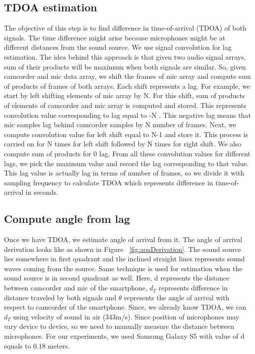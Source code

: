 \subsection{TDOA estimation}
The objective of this step is to find difference in time-of-arrival (TDOA) of both signals. The time difference might arise because microphones might be at different distances from the sound source. We use signal convolution for lag estimation. The idea behind this approach is that given two audio signal arrays, sum of their products will be maximum when both signals are similar. So, given camcorder and mic data array, we shift the frames of mic array and compute sum of products of frames of both arrays. Each shift represents a lag. For example, we start by left shifting elements of mic array by N. For this shift, sum of products of elements of camcorder and mic array is computed and  stored. This represents convolution value corresponding to lag equal to -N . This negative lag means that mic samples lag behind camcorder samples by N number of frames. Next, we compute convolution value for left shift equal to N-1 and store it. This process is carried on for N times for left shift followed by N times for right shift. We also compute sum of products for 0 lag.
From all these convolution values for different lags, we pick the maximum value and record the lag corresponding to that value. This lag value is actually lag in terms of number of frames, so we divide it with sampling frequency to calculate TDOA which represents difference in time-of-arrival in seconds.

\subsection{Compute angle from lag}
Once we have TDOA, we estimate angle of arrival from it. The angle of arrival derivation looks like as shown in Figure ~\ref{fig:aoaDerivation}. The sound source lies somewhere in first quadrant and the inclined straight lines represents sound waves coming from the source. Same technique is used for estimation when the sound source is in second quadrant as well. Here, d represents the distance between camcorder and mic of the smartphone, $d_T$ represents difference in distance traveled by both signals and $\theta$ represents the angle of arrival with respect to camcorder of the smartphone. Since, we already know TDOA, we can  $d_T$ using velocity of sound in air (343m/s). Since position of microphones may vary device to device, so we need to manually measure the distance between microphones. For our experiments, we used Samsung Galaxy S5 with value of d equals to 0.18 meters.

